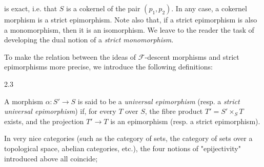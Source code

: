   is exact, i.e. that \(S\) is a cokernel of the pair \((p_1,p_2)\).
  In any case, a cokernel morphism is a strict epimorphism.
  Note also that, if a strict epimorphism is also a monomorphism, then it is an isomorphism.
  We leave to the reader the task of developing the dual notion of a \emph{strict monomorphism}.\par{}To make the relation between the ideas of \(\mathcal {F}\)-descent morphisms and strict epimorphisms more precise, we introduce the following definitions:\begin{definition}{2.3}\label{fga3.i-a.2-definition-2.3}\skipsinglepar\par{}A morphism \(\alpha \colon  S'\to  S\) is said to be a \emph{universal epimorphism} (resp. a \emph{strict universal epimorphism}) if, for every \(T\) over \(S\), the fibre product \(T'=S'\times _S T\) exists, and the projection \(T'\to  T\) is an epimorphism (resp. a strict epimorphism).\end{definition}\par{}In very nice categories (such as the category of sets, the category of sets over a topological space, abelian categories, etc.), the four notions of "epijectivity" introduced above all coincide;
